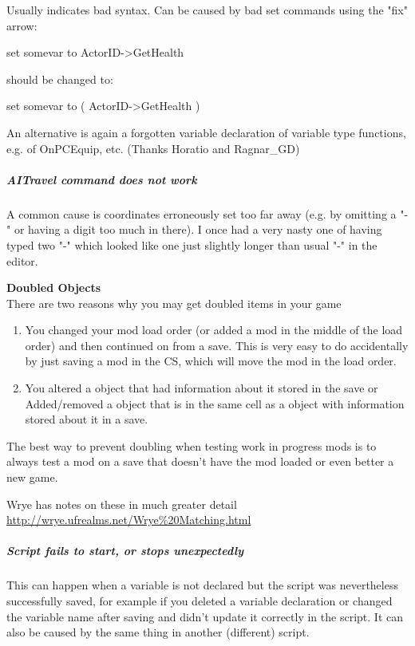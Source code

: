 \documentclass[
]{article}
\begin{document}
Usually indicates bad syntax. Can be caused by bad set commands using
the "fix" arrow:

set somevar to ActorID-\textgreater GetHealth

should be changed to:

set somevar to ( ActorID-\textgreater GetHealth )

An alternative is again a forgotten variable declaration of variable
type functions, e.g. of OnPCEquip, etc. (Thanks Horatio and Ragnar\_GD)

\hypertarget{aitravel-command-does-not-work}{%
\subparagraph{AITravel command does not
work}\label{aitravel-command-does-not-work}}

A common cause is coordinates erroneously set too far away (e.g. by
omitting a "-" or having a digit too much in there). I once had a very
nasty one of having typed two "-" which looked like one just slightly
longer than usual "-" in the editor.

\textbf{Doubled Objects\\
}There are two reasons why you may get doubled items in your game

\begin{enumerate}
\def\labelenumi{\arabic{enumi}.}
\item
  You changed your mod load order (or added a mod in the middle of the
  load order) and then continued on from a save. This is very easy to do
  accidentally by just saving a mod in the CS, which will move the mod
  in the load order.
\item
  You altered a object that had information about it stored in the save
  or Added/removed a object that is in the same cell as a object with
  information stored about it in a save.
\end{enumerate}

The best way to prevent doubling when testing work in progress mods is
to always test a mod on a save that doesn't have the mod loaded or even
better a new game.

Wrye has notes on these in much greater detail
\url{http://wrye.ufrealms.net/Wrye\%20Matching.html}

\hypertarget{script-fails-to-start-or-stops-unexpectedly}{%
\subparagraph{Script fails to start, or stops
unexpectedly}\label{script-fails-to-start-or-stops-unexpectedly}}

This can happen when a variable is not declared but the script was
nevertheless successfully saved, for example if you deleted a variable
declaration or changed the variable name after saving and didn't update
it correctly in the script. It can also be caused by the same thing in
another (different) script.
\end{document}
